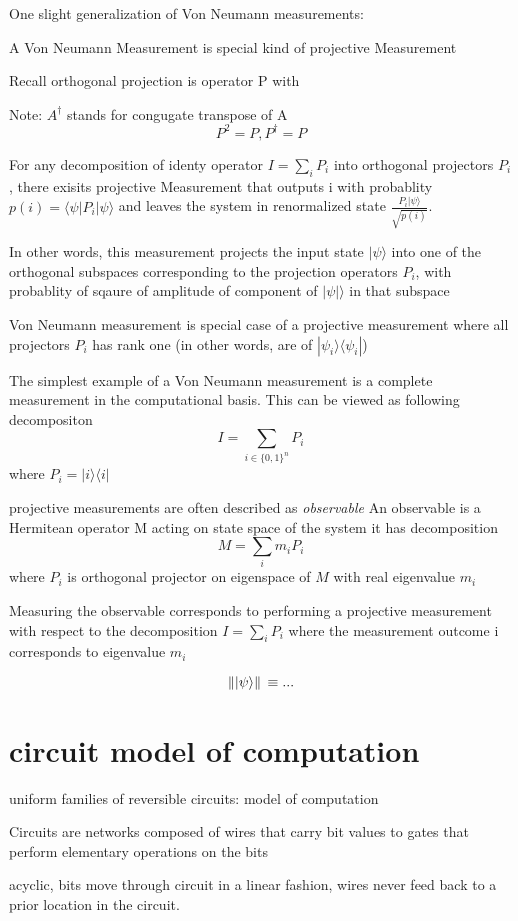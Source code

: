 \documentclass[10pt]{article}
\theoremstyle{break}
\begin{document}
One slight generalization of Von Neumann measurements:

A Von Neumann Measurement is special kind of projective Measurement

Recall orthogonal projection is operator P with 

Note: $A^\dagger$ stands for congugate transpose of A
$$P^2=P, P^\dagger = P$$

For any decomposition of identy operator $I=\sum_iP_i$
into orthogonal projectors $P_i$, there exisits projective Measurement
that outputs i with probablity $p(i)=\langle \psi|P_i|\psi\rangle$
and leaves the system in renormalized state $\frac{P_i|\psi\rangle}{\sqrt{p(i)}}$.

In other words, this measurement projects the input state $|\psi\rangle$ into 
one of the orthogonal subspaces corresponding to the projection operators 
$P_i$, with probablity of sqaure of amplitude of component of $|\psi|\rangle$ in that subspace


Von Neumann measurement is special case of a projective measurement where all projectors $P_i$ has rank one 
(in other words, are of $|\psi_i\rangle\langle\psi_i|$)

The simplest example of a Von Neumann measurement is a complete measurement in the 
computational basis. This can be viewed as following decompositon 
$$I=\sum_{i\in\{0,1\}^n}P_i$$
where $P_i=|i\rangle\langle i|$

projective measurements are often described as \emph{observable}
An observable is a Hermitean operator M acting on state space of the system 
it has decomposition
$$M=\sum_im_iP_i$$
where $P_i$ is orthogonal projector on eigenspace of $M$ with real eigenvalue $m_i$

Measuring the observable corresponds to performing a projective measurement 
with respect to the decomposition $I=\sum_iP_i$ where the measurement outcome 
i corresponds to eigenvalue $m_i$

$$\norm*{|\psi\rangle}\equiv ... $$


\section{circuit model of computation}
uniform families of reversible circuits: model of computation

 Circuits are networks composed of wires that carry bit values to gates that 
 perform elementary operations on the bits

 acyclic, bits move through circuit in a linear fashion, wires never feed back to a prior location in the circuit. 
\end{document}
